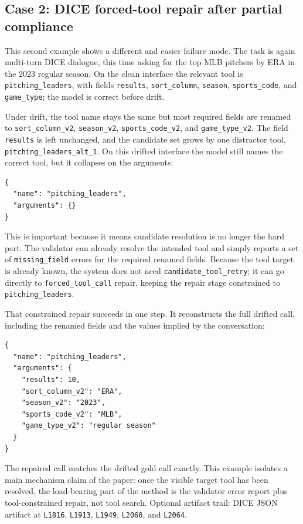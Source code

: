 \documentclass{svproc}
\newcommand{\artifactlink}[2]{#2}
\newcommand{\artifactref}[2]{\texttt{L#2}}
\newcommand{\dicerunfile}{outputs/dice/dice-bench-live-20260414-170240-443375/dice_results.json}
\newcommand{\dicerunlink}{\artifactlink{\dicerunfile}{DICE JSON artifact}}
\begin{document}
\subsection{Case 2: DICE forced-tool repair after partial compliance}
This second example shows a different and easier failure mode. The task is again
multi-turn DICE dialogue, this time asking for the top MLB pitchers by ERA in the
2023 regular season. On the clean interface the relevant tool is
\texttt{pitching\_leaders}, with fields \texttt{results}, \texttt{sort\_column},
\texttt{season}, \texttt{sports\_code}, and \texttt{game\_type}; the model is
correct before drift.

Under drift, the tool name stays the same but most required fields are renamed to
\texttt{sort\_column\_v2}, \texttt{season\_v2}, \texttt{sports\_code\_v2}, and
\texttt{game\_type\_v2}. The field \texttt{results} is left unchanged, and the
candidate set grows by one distractor tool,
\texttt{pitching\_leaders\_alt\_1}. On this drifted interface the model still
names the correct tool, but it collapses on the arguments:

\begin{verbatim}
{
  "name": "pitching_leaders",
  "arguments": {}
}
\end{verbatim}

This is important because it means candidate resolution is no longer the hard
part. The validator can already resolve the intended tool and simply reports a
set of \texttt{missing\_field} errors for the required renamed fields. Because
the tool target is already known, the system does not need
\texttt{candidate\_tool\_retry}; it can go directly to
\texttt{forced\_tool\_call} repair, keeping the repair stage constrained to
\texttt{pitching\_leaders}.

That constrained repair succeeds in one step. It reconstructs the full drifted
call, including the renamed fields and the values implied by the conversation:

\begin{verbatim}
{
  "name": "pitching_leaders",
  "arguments": {
    "results": 10,
    "sort_column_v2": "ERA",
    "season_v2": "2023",
    "sports_code_v2": "MLB",
    "game_type_v2": "regular season"
  }
}
\end{verbatim}

The repaired call matches the drifted gold call exactly. This example isolates a
main mechanism claim of the paper: once the visible target tool has been
resolved, the load-bearing part of the method is the validator error report plus
tool-constrained repair, not tool search. Optional artifact trail:
\dicerunlink{} at \artifactref{\dicerunfile}{1816},
\artifactref{\dicerunfile}{1913}, \artifactref{\dicerunfile}{1949},
\artifactref{\dicerunfile}{2060}, and \artifactref{\dicerunfile}{2064}.
\end{document}
